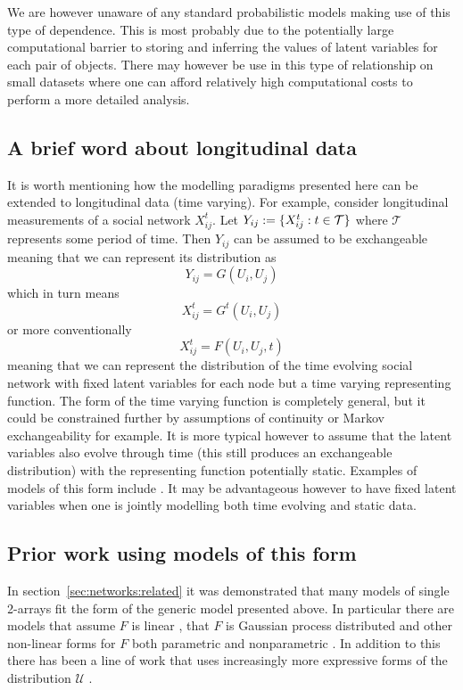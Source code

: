We are however unaware of any standard probabilistic models making use of this type of dependence.
This is most probably due to the potentially large computational barrier to storing and inferring the values of latent variables for each pair of objects.
There may however be use in this type of relationship on small datasets where one can afford relatively high computational costs to perform a more detailed analysis.

\subsection{A brief word about longitudinal data}

It is worth mentioning how the modelling paradigms presented here can be extended to longitudinal data (\ie time varying).
For example, consider longitudinal measurements of a social network $X_{ij}^t$.
Let $Y_{ij} := \{X_{ij}^t : t \in \mathcal{T}\}$ where $\mathcal{T}$ represents some period of time.
Then $Y_{ij}$ can be assumed to be exchangeable meaning that we can represent its distribution as
\[
  Y_{ij} = G(U_i, U_j)
\]
which in turn means
\[
  X_{ij}^t = G^t(U_i, U_j)
\]
or more conventionally
\[
  X_{ij}^t = F(U_i, U_j, t)
\]
meaning that we can represent the distribution of the time evolving social network with fixed latent variables for each node but a time varying representing function.
The form of the time varying function is completely general, but it could be constrained further by assumptions of continuity or Markov exchangeability for example.
It is more typical however to assume that the latent variables also evolve through time (this still produces an exchangeable distribution) with the representing function potentially static.
Examples of models of this form include \citep[e.g.][]{Adams2010-ln, durante2014bayesian}.
It may be advantageous however to have fixed latent variables when one is jointly modelling both time evolving and static data.

\subsection{Prior work using models of this form}

In section~\ref{sec:networks:related} it was demonstrated that many models of single 2-arrays fit the form of the generic model presented above.
In particular there are models that assume $F$ is linear \citep[e.g.][]{Hoff2007-ja, Meeds2007-gd, Salakhutdinov2008-zt, Yu2008-tz, Miller2009-wg}, that $F$ is Gaussian process distributed \citep[e.g.][]{Lawrence2009-za, Yan2011-lc, Lloyd2012-sb} and other non-linear forms for $F$ both parametric \citep[e.g.][]{Hoff2002-vy} and nonparametric \citep[e.g.][]{Roy2009-ge}.
In addition to this there has been a line of work that uses increasingly more expressive forms of the distribution $\mathcal{U}$ \citep[e.g.][]{Wang1987-jd, Hoffman_undated-ri, Nowicki2001-xm, Kemp2006-jt, Xu2006-uy, Meeds2007-gd, Miller2009-wg, Palla2012-ch}.

